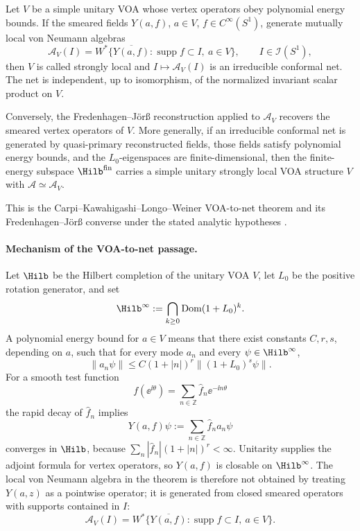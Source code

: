 \begin{quotedtheorem}
\label{qthm:voa-to-conformal-net}
Let \(V\) be a simple unitary VOA whose vertex operators obey polynomial
energy bounds.  If the smeared fields \(Y(a,f)\), \(a\in V\),
\(f\in C^\infty(S^1)\), generate mutually local von Neumann algebras
\[
  \mathcal A_V(I)
  =
  W^*\{\overline{Y(a,f)}:\operatorname{supp}f\subset I,\ a\in V\},
  \qquad I\in\mathcal I(S^1),
\]
then \(V\) is called strongly local and \(I\mapsto\mathcal A_V(I)\) is an
irreducible conformal net.  The net is independent, up to isomorphism, of
the normalized invariant scalar product on \(V\).

Conversely, the Fredenhagen--J\"or{\ss} reconstruction applied to
\(\mathcal A_V\) recovers the smeared vertex operators of \(V\).  More
generally, if an irreducible conformal net is generated by quasi-primary
reconstructed fields, those fields satisfy polynomial energy bounds, and the
\(L_0\)-eigenspaces are finite-dimensional, then the finite-energy subspace
\(\Hilb^{\mathrm{fin}}\) carries a simple unitary strongly local VOA
structure \(V\) with \(\mathcal A\simeq\mathcal A_V\).

This is the Carpi--Kawahigashi--Longo--Weiner VOA-to-net theorem and its
Fredenhagen--J\"or{\ss} converse under the stated analytic hypotheses
\cite{CarpiKawahigashiLongoWeiner2018}.
\end{quotedtheorem}

\paragraph{Mechanism of the VOA-to-net passage.}
Let \(\Hilb\) be the Hilbert completion of the unitary VOA \(V\), let
\(L_0\) be the positive rotation generator, and set
\[
  \Hilb^\infty:=\bigcap_{k\ge0}\operatorname{Dom}(1+L_0)^k .
\]
A polynomial energy bound for \(a\in V\) means that there exist constants
\(C,r,s\), depending on \(a\), such that for every mode \(a_n\) and every
\(\psi\in\Hilb^\infty\),
\begin{equation}
  \|a_n\psi\|
  \le
  C(1+|n|)^r\|(1+L_0)^s\psi\|.
  \label{eq:voa-polynomial-energy-bound}
\end{equation}
For a smooth test function
\[
  f(\ee^{\ii\theta})=\sum_{n\in\mathbb Z}\hat f_n\ee^{-\ii n\theta}
\]
the rapid decay of \(\hat f_n\) implies
\begin{equation}
  Y(a,f)\psi
  :=
  \sum_{n\in\mathbb Z}\hat f_n a_n\psi
  \label{eq:voa-smeared-field-series}
\end{equation}
converges in \(\Hilb\), because
\(\sum_n|\hat f_n|(1+|n|)^r<\infty\).  Unitarity supplies the adjoint
formula for vertex operators, so \(Y(a,f)\) is closable on
\(\Hilb^\infty\).  The local von Neumann algebra in the theorem is therefore
not obtained by treating \(Y(a,z)\) as a pointwise operator; it is generated
from closed smeared operators with supports contained in \(I\):
\[
  \mathcal A_V(I)
  =
  W^*\{\overline{Y(a,f)}:\operatorname{supp}f\subset I,\ a\in V\}.
\]

